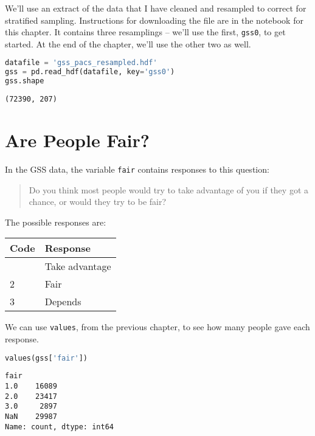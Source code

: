 We'll use an extract of the data that I have cleaned and resampled to
correct for stratified sampling. Instructions for downloading the file
are in the notebook for this chapter. It contains three resamplings --
we'll use the first, \passthrough{\lstinline!gss0!}, to get started. At
the end of the chapter, we'll use the other two as well.

\begin{lstlisting}[language=Python,style=source]
datafile = 'gss_pacs_resampled.hdf'
gss = pd.read_hdf(datafile, key='gss0')
gss.shape
\end{lstlisting}

\begin{lstlisting}[style=output]
(72390, 207)
\end{lstlisting}

\section{Are People Fair?}\label{are-people-fair}

In the GSS data, the variable \passthrough{\lstinline!fair!} contains
responses to this question:

\begin{quote}
Do you think most people would try to take advantage of you if they got
a chance, or would they try to be fair?
\end{quote}

The possible responses are:

\begin{longtable}[]{ll}
\toprule
Code & Response \\
\midrule
\endhead
\bottomrule
\endlastfoot
1 & Take advantage \\
2 & Fair \\
3 & Depends \\
\end{longtable}

We can use \passthrough{\lstinline!values!}, from the previous chapter,
to see how many people gave each response.

\begin{lstlisting}[language=Python,style=source]
values(gss['fair'])
\end{lstlisting}

\begin{lstlisting}[style=output]
fair
1.0    16089
2.0    23417
3.0     2897
NaN    29987
Name: count, dtype: int64
\end{lstlisting}

